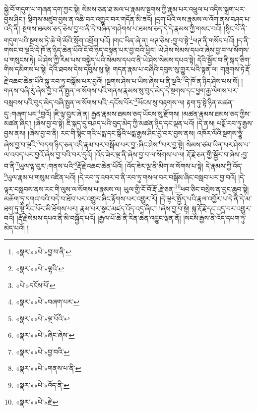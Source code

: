 སྐྱེ་བོ་གདུག་པ་གཞན་དག་ཀྱང་སྟེ། སེམས་ཅན་ཐ་མལ་པ་རྣམས་སྔགས་ཀྱི་རྣམ་པར་འཕྲུལ་པ་འདིས་སྐྲག་པར་བྱས་ཤིང་། སྡིགས་མཛུབ་བྱས་ན་འཆི་བར་འགྱུར་བར་གདོན་མི་ཟའོ། །དྲག་པོའི་ལས་རྣམས་ལ་འོག་ནས་བཤད་པ་འདི་ནི། སྔགས་ཐམས་ཅད་ཅེས་བྱ་བ་ནི་དེ་བཞིན་གཤེགས་པ་ཐམས་ཅད་དེ་དེ་རྣམས་ཀྱི་གསང་བའོ། །སྙིང་པོ་ནི་གདུག་པའི་སྔགས་ཏེ་ཆེ་གེ་མོའི་སྲོག་འཕྲོག་པའོ། །གང་ཡིན་ཞེ་ན། ཕཊ་ཅེས་:བྱ་བ་སྟེ་\footnote{«སྣར་»«པེ་»བྱ་བ་ནི་}ཕཊ་ནི་གསོད་པའོ། །ད་ནི་གསང་བ་ལྔའི་དེ་ཁོ་ན་ཉིད་ཆེན་པོའི་ངོ་བོ་ཉིད་བསྟན་པར་བྱ་བའི་ཕྱིར། ཡེ་ཤེས་སེམས་དཔའ་ཞེས་བྱ་བ་ལ་སོགས་པ་གསུངས་ཏེ། ཡེ་ཤེས་ཀྱི་རིམ་པས་བསྐྱེད་པའི་སེམས་དཔའ་ནི་ཡེ་ཤེས་སེམས་དཔའ་སྟེ། དེའི་སྦྱོར་བ་ནི་སྐད་ཅིག་གིས་དམིགས་པ་སྟེ། དེའི་ཐབས་དེས་དབུས་སུ་སྟེ། གདན་རྣམ་པ་བཞིའི་དབུས་སུ་གྱུར་པའི་སྟན་ལ། གཟུགས་ཏེ་རྡོ་རྗེ་འཆང་ཆེན་པོའི་སྐུ་རབ་ཏུ་བསྒོམ་པར་བྱའོ། །སྔགས་ཤེས་པ་ཡིས་ཞེས་པ་ནི་ལྔའི་\footnote{«སྣར་»«པེ་»ལྷའི་}དེ་ཁོ་ན་ཉིད་ཤེས་པས་སོ། །གནས་བཞི་རུ་ཞེས་བྱ་བ་ནི་སྤྱན་ལ་སོགས་པའི་གནས་རྣམས་སུ་བུད་མེད་དེ་སྔགས་དང་ཕྱག་རྒྱ་ལེགས་པར་བསླབས་པའི་བུད་མེད་བཞི་སྤྱན་ལ་སོགས་པའི་:དངོས་པོར་\footnote{«པེ་»དངོས་པོ་}ཡོངས་སུ་བརྟགས་ལ། རྟག་ཏུ་སྟེ་ཉིན་མཚན་དུ་:གཞག་པར་\footnote{«སྣར་»«པེ་»བཞག་པར་}བྱའོ། །ཇི་ལྟ་བུར་ཞེ་ན། རྒྱན་རྣམས་ཐམས་ཅད་ཡོངས་སུ་རྫོགས། །མཚན་རྣམས་ཐམས་ཅད་ཀྱིས་མཚན་ཞིང་། །ཞེས་བྱ་བ་སྟེ། ཇི་སྐད་དུ་བཤད་པའི་བུད་མེད་ཀྱི་མཚན་ཉིད་དང་ལྡན་པའོ། །དེ་ནས། པདྨོ་རབ་ཏུ་རྒྱས་བྱས་ནས། །ཞེས་བྱ་བ་ནི། རང་གི་སྙིང་གའི་པདྨ་དང་སྒོའི་པདྨ་རྒྱས་ཤིང་བྱེ་བར་བྱས་ནས། འཁོར་ལོའི་སྔགས་ཧཱུཾ་ཞེས་བྱ་བ་ལྔའི་\footnote{«སྣར་»«པེ་»ལྔ་པོའི་}བདག་ཉིད་ཅན་འདི་རྣམ་པར་བསྒོམ་པར་བྱ་:ཞིང་ཤེས་\footnote{«སྣར་»«པེ་»ཞིང་ཞེས་}པར་བྱ་སྟེ། སེམས་ཙམ་ཡིན་པར་ཤེས་པ་ལ་འབད་པར་བྱའོ་ཞེས་བྱ་བའི་བར་དུའོ། །འོད་ཟེར་ལྔ་ནི་ཞེས་བྱ་བ་ལ་སོགས་པ་ལ། རྡོ་རྗེ་ཅན་གྱི་སྦྱོར་བ་ཞེས་:བྱ་བ་ནི་\footnote{«སྣར་»«པེ་»བྱ་བའི་}ཡུལ་ལྟ་བུར་:གནས་པའི་\footnote{«སྣར་»«པེ་»གནས་པ་ནི་}རྡོ་རྗེ་འཆང་ཆེན་པོའོ། །འོད་ཟེར་ལྔ་ནི་མིག་ལ་སོགས་པ་སྟེ། དེ་རྣམས་ཀྱི་འོད་\footnote{«སྣར་»«པེ་»འོད་ནི་}ཡུལ་རྣམ་པ་གསུམ་འཛིན་པའོ། །དེ་རབ་ཏུ་འབར་བ་ནི་རབ་ཏུ་གསལ་བར་བསྒོམ་ཞིང་བསླབ་པར་བྱ་བའོ། །དེ་ལྟར་བསླབས་ནས་རང་གི་ལུས་ལ་སོགས་པ་རྣམས་ལ། ཡུལ་གྱི་ངོ་བོ་རྡོ་:རྗེ་ཅན་\footnote{«སྣར་»«པེ་»རྗེ་}ཕབ་ཅིང་བསྲེས་ན་བྱང་ཆུབ་སྟེ། མཆོག་ཏུ་དགའ་བའི་བདེ་བ་ཐོབ་པར་འགྱུར་ཞིང་རྟོགས་པར་འགྱུར་རོ། །དེ་ལྟར་སྤྱོད་པའི་རྣལ་འབྱོར་པ་དེ་ནི་དེ་མ་ཐག་ཏུ་སྟེ་རིང་པོར་མི་ཐོགས་པར། རྣམ་པར་སྣང་མཛད་འོད་འདྲ་ཞིང་། །ཞེས་བྱ་བ་སྟེ། སྐུ་རྡོ་རྗེ་དང་འདྲ་བར་འགྱུར་བའོ། །རྡོ་རྗེ་སེམས་དཔའ་ནི་མི་བསྐྱོད་པའོ། །རྒྱལ་པོ་ཆེ་ནི་རིན་ཆེན་འབྱུང་ལྡན་ནོ། །སངས་རྒྱས་ནི་འོད་དཔག་ཏུ་མེད་པའོ། །
